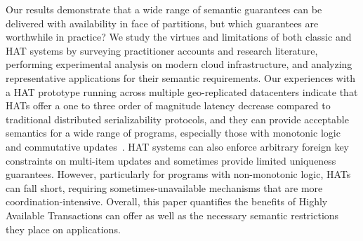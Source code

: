Our results demonstrate that a wide range of semantic guarantees can
be delivered with availability in face of partitions, but which
guarantees are worthwhile in practice? We study the virtues and
limitations of both classic and HAT systems by surveying practitioner
accounts and research literature, performing experimental analysis on
modern cloud infrastructure, and analyzing representative applications
for their semantic requirements. Our experiences with a HAT prototype
running across multiple geo-replicated datacenters indicate that HATs
offer a one to three order of magnitude latency decrease compared to
traditional distributed serializability protocols, and they can
provide acceptable semantics for a wide range of programs, especially
those with monotonic logic and commutative updates~\cite{calm, blooml,
  crdt}. HAT systems can also enforce arbitrary foreign key
constraints on multi-item updates and sometimes provide limited
uniqueness guarantees. However, particularly for programs with
non-monotonic logic, HATs can fall short, requiring
sometimes-unavailable mechanisms that are more
coordination-intensive. Overall, this paper quantifies the benefits of
Highly Available Transactions can offer as well as the necessary
semantic restrictions they place on applications.




